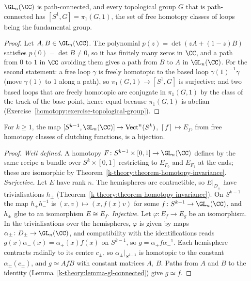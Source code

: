 \begin{lemma}\label{k-theory:lemma-gl-connected}
$\GL_n(\CC)$ is path-connected, and every topological group $G$ that is path-connected has $[S^1, G] = \pi_1(G, 1)$, the set of free homotopy classes of loops being the fundamental group.
\end{lemma}

\begin{proof}
Let $A, B \in \GL_n(\CC)$. The polynomial $p(z) = \det(zA + (1 - z)B)$ satisfies $p(0) = \det B \neq 0$, so it has finitely many zeros in $\CC$, and a path from $0$ to $1$ in $\CC$ avoiding them gives a path
from $B$ to $A$ in $\GL_n(\CC)$. For the second statement: a free loop $\gamma$ is freely homotopic to the based loop $\gamma(1)^{-1}\gamma$ (move $\gamma(1)$ to $1$ along a path), so
$\pi_1(G, 1) \to [S^1, G]$ is surjective; and two based loops that are freely homotopic are conjugate in $\pi_1(G, 1)$ by the class of the track of the base point, hence equal because
$\pi_1(G, 1)$ is abelian (Exercise~\ref{homotopy:exercise-topological-group}).
\end{proof}

\begin{proposition}\label{k-theory:proposition-clutching}
For $k \geq 1$, the map $[S^{k-1}, \GL_n(\CC)] \to \mathrm{Vect}^n(S^k)$, $[f] \mapsto E_f$, from free homotopy classes of clutching functions, is a bijection.
\end{proposition}

\begin{proof}
\emph{Well defined.} A homotopy $F \colon S^{k-1} \times [0, 1] \to \GL_n(\CC)$ defines by the same recipe a bundle over $S^k \times [0, 1]$ restricting to $E_{F_0}$ and $E_{F_1}$ at the ends; these are isomorphic by
Theorem~\ref{k-theory:theorem-homotopy-invariance}.
\emph{Surjective.} Let $E$ have rank $n$. The hemispheres are contractible, so $E|_{D_\pm}$ have trivialisations $h_\pm$ (Theorem~\ref{k-theory:theorem-homotopy-invariance}). On $S^{k-1}$ the map
$h_+h_-^{-1}$ is $(x, v) \mapsto (x, f(x)v)$ for some $f \colon S^{k-1} \to \GL_n(\CC)$, and $h_\pm$ glue to an isomorphism $E \cong E_f$.
\emph{Injective.} Let $\varphi \colon E_f \to E_g$ be an isomorphism. In the trivialisations over the hemispheres, $\varphi$ is given by maps $\alpha_\pm \colon D_\pm \to \GL_n(\CC)$, and compatibility with the
identifications reads $g(x)\alpha_-(x) = \alpha_+(x)f(x)$ on $S^{k-1}$, so $g = \alpha_+f\alpha_-^{-1}$. Each hemisphere contracts radially to its centre $c_\pm$, so $\alpha_\pm|_{S^{k-1}}$ is homotopic to the
constant $\alpha_\pm(c_\pm)$, and $g \simeq Af B$ with constant matrices $A$, $B$. Paths from $A$ and $B$ to the identity (Lemma~\ref{k-theory:lemma-gl-connected}) give $g \simeq f$.
\end{proof}

